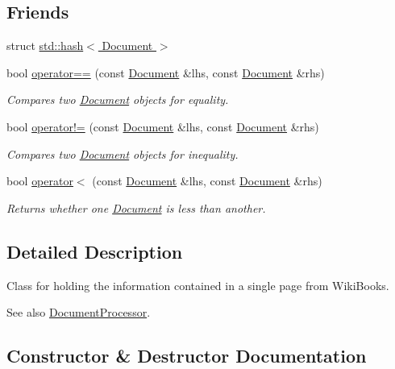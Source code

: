\subsection*{Friends}
\begin{DoxyCompactItemize}
\item 
struct \hyperlink{class_document_ac81fac7a8d9ba85529addc5b3299f2ff}{std\+::hash$<$ Document $>$}
\item 
bool \hyperlink{class_document_ad4716fc286025a1c6b8020e517833e03}{operator==} (const \hyperlink{class_document}{Document} \&lhs, const \hyperlink{class_document}{Document} \&rhs)
\begin{DoxyCompactList}\small\item\em Compares two \hyperlink{class_document}{Document} objects for equality. \end{DoxyCompactList}\item 
bool \hyperlink{class_document_a333a5550c36ff69a94c749828fcf0165}{operator!=} (const \hyperlink{class_document}{Document} \&lhs, const \hyperlink{class_document}{Document} \&rhs)
\begin{DoxyCompactList}\small\item\em Compares two \hyperlink{class_document}{Document} objects for inequality. \end{DoxyCompactList}\item 
bool \hyperlink{class_document_a180fade9b73b45b1619be1e857b5b39e}{operator$<$} (const \hyperlink{class_document}{Document} \&lhs, const \hyperlink{class_document}{Document} \&rhs)
\begin{DoxyCompactList}\small\item\em Returns whether one \hyperlink{class_document}{Document} is less than another. \end{DoxyCompactList}\end{DoxyCompactItemize}


\subsection{Detailed Description}
Class for holding the information contained in a single page from Wiki\+Books. 

\begin{DoxySeeAlso}{See also}
\hyperlink{class_document_processor}{Document\+Processor}. 
\end{DoxySeeAlso}


\subsection{Constructor \& Destructor Documentation}
\hypertarget{class_document_acdbcbe550084e8c20f4f67eb229ad66a}{}
